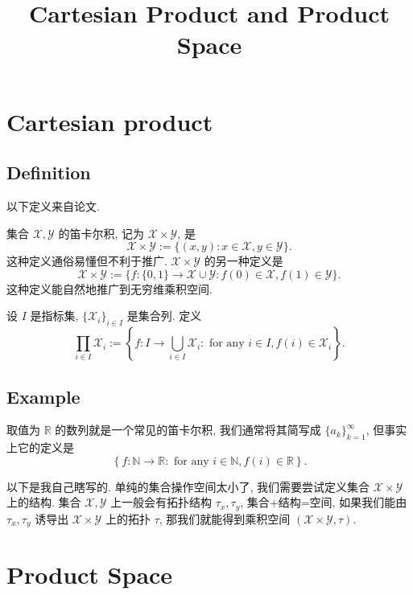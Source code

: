 \documentclass[a4paper,11pt]{article}
\title{Cartesian Product and Product Space}
\theoremstyle{definition}
\begin{document}
\begin{CJK*}{UTF8}{gbsn}

\maketitle



\section{Cartesian product}

\subsection{Definition}

以下定义来自论文\cite[p.113]{m75}.

集合 $ \mathcal{X}, \mathcal{Y} $ 的笛卡尔积, 记为 $ \mathcal{X} \times \mathcal{Y} $, 是
$$ 
    \mathcal{X} \times \mathcal{Y}
        := \{(x, y) : x \in \mathcal{X}, y \in \mathcal{Y} \}.
$$
这种定义通俗易懂但不利于推广. 
$ \mathcal{X} \times \mathcal{Y} $ 的另一种定义是
$$
    \mathcal{X} \times \mathcal{Y}
        := \{ f: \{0, 1\} \to \mathcal{X} \cup \mathcal{Y} : f(0) \in \mathcal{X}, f(1) \in \mathcal{Y} \}.
$$
这种定义能自然地推广到无穷维乘积空间.

设 $ I $ 是指标集, $ \{\mathcal{X}_i\}_{i \in I} $ 是集合列.
定义
$$
    \prod_{i \in I} \mathcal{X}_i
        := \left\{ f: I \to \bigcup_{i \in I} \mathcal{X}_i 
            : \text{ for any } i \in I, f(i) \in \mathcal{X}_i \right\}.
$$

\subsection{Example}

取值为 $ \mathbb{R} $ 的数列就是一个常见的笛卡尔积, 我们通常将其简写成 $ \{a_k\}_{k = 1}^\infty $,
但事实上它的定义是
$$
    \left\{ f: \mathbb{N} \to \mathbb{R}
        : \text{ for any } i \in \mathbb{N}, f(i) \in \mathbb{R} \right\}.
$$

以下是我自己瞎写的.
单纯的集合操作空间太小了, 我们需要尝试定义集合 $ \mathcal{X} \times \mathcal{Y} $ 上的结构.
集合 $ \mathcal{X}, \mathcal{Y} $ 上一般会有拓扑结构 $ \tau_x, \tau_y $, 集合+结构=空间,
如果我们能由 $ \tau_x, \tau_y $ 诱导出 $ \mathcal{X} \times \mathcal{Y} $ 上的拓扑 $ \tau $,
那我们就能得到乘积空间 $ (\mathcal{X} \times \mathcal{Y}, \tau) $.

\section{Product Space}


\end{CJK*}
\end{document}
